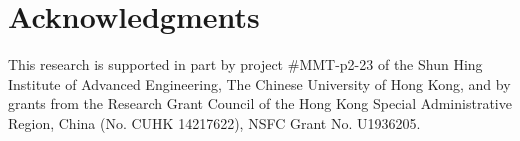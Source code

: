 \section*{Acknowledgments}

This research is supported in part by project \#MMT-p2-23 of the Shun Hing Institute of Advanced Engineering, The Chinese University of Hong Kong, and by grants from the Research Grant Council of the Hong Kong Special Administrative Region, China (No. CUHK 14217622), NSFC Grant No. U1936205.   

